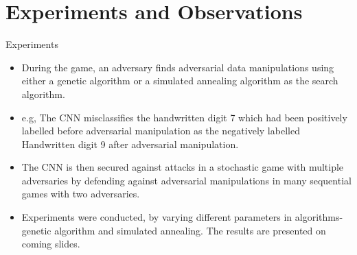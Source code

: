 \documentclass[10pt]{beamer}
\begin{document}
\section{Experiments and Observations}

\begin{frame}{Experiments}
	\begin{itemize}
        \item During the game, an adversary finds adversarial data manipulations using either a genetic algorithm or a simulated annealing algorithm as the search algorithm.
        \item e.g, The CNN misclassifies the handwritten digit 7 which had been positively labelled before adversarial manipulation as the negatively labelled Handwritten digit 9 after adversarial manipulation. 
        \item The CNN is then secured against attacks in a stochastic game with multiple adversaries by defending against adversarial manipulations in many sequential games with two adversaries.
        \item Experiments were conducted, by varying different parameters in algorithms- genetic algorithm and simulated annealing. The results are presented on coming slides.
	\end{itemize}
\end{frame}
\end{document}

